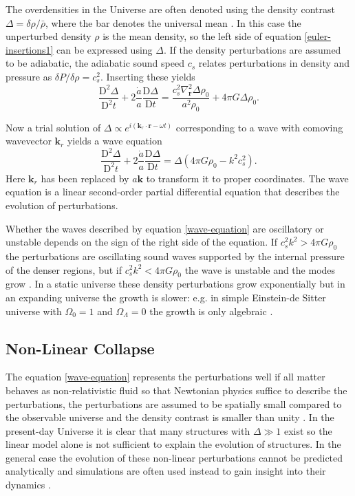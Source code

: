 \documentclass[english, oneside]{HYgradu}
\begin{document}
The overdensities in the Universe are often denoted using the density contrast $\Delta = \delta\rho/\bar{\rho}$, where the bar denotes the universal mean \citep{mo2010galaxy}. In this case the unperturbed density $\rho$ is the mean density, so the left side of equation \ref{euler-insertions1} can be expressed using $\Delta$. If the density perturbations are assumed to be adiabatic, the adiabatic sound speed $c_s$ relates perturbations in density and pressure as $\delta P / \delta \rho = c_s^2$. Inserting these yields
\begin{equation}\label{euler-insertions1}
\frac{\textrm{D}^2\Delta}{\textrm{D}^2 t} + 2 \frac{\dot a}{a} \frac{\textrm{D}\Delta}{\textrm{D} t} = \frac{c_s^2 \nabla_\mathbf{r}^2 \Delta \rho_0}{a^2 \rho_0} + 4 \pi G \Delta \rho_0.
\end{equation}

Now a trial solution of $\Delta \propto e^{i(\mathbf{k}_r\cdot\mathbf{r}-\omega t)}$ corresponding to a wave with comoving wavevector $\mathbf{k}_r$ yields a wave equation
\begin{equation}\label{wave-equation}
\frac{\textrm{D}^2\Delta}{\textrm{D}^2 t} + 2 \frac{\dot a}{a} \frac{\textrm{D}\Delta}{\textrm{D} t} = \Delta(4\pi G \rho_0 - k^2c_s^2).
\end{equation}
Here $\mathbf{k}_r$ has been replaced by $a\mathbf{k}$ to transform it to proper coordinates. The wave equation is a linear second-order partial differential equation that describes the evolution of perturbations.

Whether the waves described by equation \ref{wave-equation} are oscillatory or unstable depends on the sign of the right side of the equation. If $c_s^2k^2 > 4\pi G\rho_0$ the perturbations are oscillating sound waves  supported by the internal pressure of the denser regions, but if $c_s^2k^2 < 4\pi G\rho_0$ the wave is unstable and the modes grow \citep{longair2008galaxy}. In a static universe these density perturbations grow exponentially but in an expanding universe the growth is slower: e.g. in simple Einstein-de Sitter universe with $\Omega_0 = 1$ and $\Omega_\Lambda = 0$ the growth is only algebraic \citep{longair2008galaxy}.

\subsection{Non-Linear Collapse} \label{universe-collapse}

The equation \ref{wave-equation} represents the perturbations well if all matter behaves as non-relativistic fluid so that Newtonian physics suffice to describe the perturbations, the perturbations are assumed to be spatially small compared to the observable universe and the density contrast is smaller than unity \citep{mo2010galaxy}. In the present-day Universe it is clear that many structures with $\Delta \gg 1$ exist so the linear model alone is not sufficient to explain the evolution of structures. In the general case the evolution of these non-linear perturbations cannot be predicted analytically and simulations are often used instead to gain insight into their dynamics \citep{mo2010galaxy}.
\end{document}
